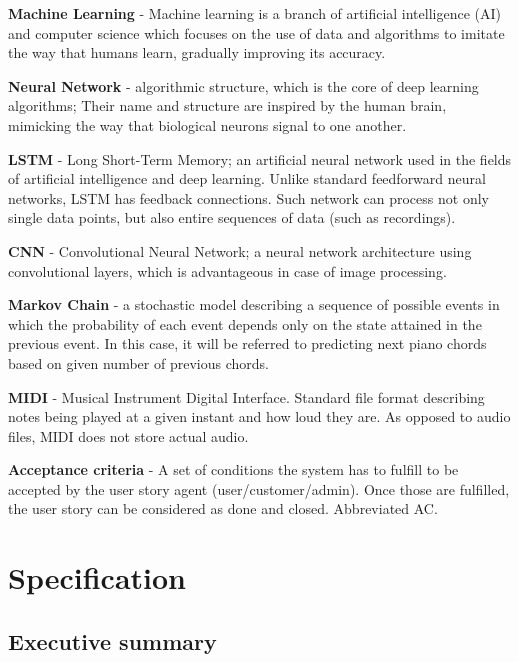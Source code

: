 \documentclass{article}
\begin{document}
\vskip5pt \noindent
\textbf{Machine Learning} - Machine learning is a branch of artificial intelligence (AI) and computer science which focuses on the use of data and algorithms to imitate the way that humans learn, gradually improving its accuracy. \cite{ML_IBM}

\vskip5pt \noindent
\textbf{Neural Network} - algorithmic structure, which is the core of deep learning algorithms; Their name and structure are inspired by the human brain, mimicking the way that biological neurons signal to one another. \cite{NN_IBM}

\vskip5pt \noindent
\textbf{LSTM} - Long Short-Term Memory; an artificial neural network used in the fields of artificial intelligence and deep learning. Unlike standard feedforward neural networks, LSTM has feedback connections. Such network can process not only single data points, but also entire sequences of data (such as recordings). \cite{LSTM}

\vskip5pt \noindent
\textbf{CNN} - Convolutional Neural Network; a neural network architecture using convolutional layers, which is advantageous in case of image processing. \cite{CNN}

\vskip5pt \noindent
\textbf{Markov Chain} - a stochastic model describing a sequence of possible events in which the probability of each event depends only on the state attained in the previous event. In this case, it will be referred to predicting next piano chords based on given number of previous chords. \cite{Markov}

\vskip5pt \noindent
\textbf{MIDI} - Musical Instrument Digital Interface. Standard file format describing notes being played at a given instant and how loud they are. As opposed to audio files, MIDI does not store actual audio.


\vskip5pt \noindent
\textbf{Acceptance criteria} - A set of conditions the system has to fulfill to be accepted by the user story agent (user/customer/admin). Once those are fulfilled, the user story can be considered as done and closed. Abbreviated AC.


\section{Specification}

\subsection{Executive summary}
\end{document}
